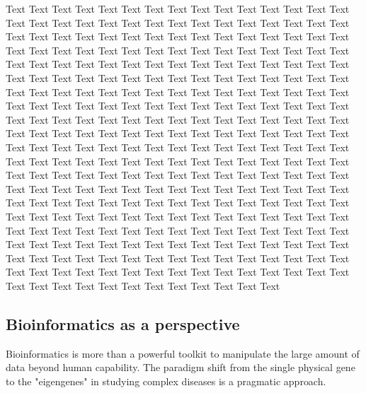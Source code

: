 \documentclass[letter]{bioinfo}
\begin{document}
Text Text Text Text Text Text  Text Text Text Text Text Text Text Text  Text Text Text Text Text Text Text Text  Text Text Text Text Text Text Text Text  Text Text Text Text Text Text Text Text  Text Text Text Text Text Text Text Text  Text Text Text Text Text Text Text Text  Text Text Text Text Text Text Text Text  Text Text Text Text Text Text Text Text  Text Text Text Text Text Text Text Text  Text Text Text Text Text Text Text Text  Text Text Text Text Text Text Text Text  Text Text Text Text Text Text Text Text  Text Text Text Text Text Text Text Text  Text Text Text Text Text Text Text Text  Text Text Text Text Text Text Text Text  Text Text Text Text Text Text Text Text  Text Text Text Text Text Text Text Text  Text Text Text Text Text Text Text Text  Text Text Text Text Text Text Text Text  Text Text Text Text Text Text Text Text  Text Text Text Text Text Text Text Text  Text Text Text Text Text Text Text Text  Text Text Text Text Text Text Text Text  Text Text Text Text Text Text Text Text  Text Text Text Text Text Text Text Text  Text Text Text Text Text Text Text Text  Text Text Text Text Text Text Text Text  Text Text Text Text Text Text Text Text  Text Text Text Text Text Text Text Text  Text Text Text Text Text Text Text Text  Text Text Text Text Text Text Text Text  Text Text Text Text Text Text Text Text  Text Text Text Text Text Text Text Text  Text Text Text Text Text Text Text Text  Text Text Text Text Text Text Text Text  Text Text Text Text Text Text Text Text  Text Text Text Text Text Text Text Text  Text Text Text Text Text Text Text Text  Text Text 
%
%
%
%
\subsection{Bioinformatics as a perspective}

Bioinformatics is more than a powerful toolkit to manipulate the large amount of data beyond human capability. The paradigm shift from the single physical gene to the "eigengenes" in studying complex diseases \citep{Weiss:2012:Good} is a pragmatic approach.
\end{document}
